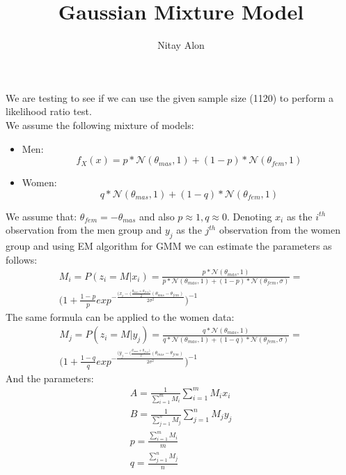 \documentclass[12pt]{article}
\title{Gaussian Mixture Model}
\author{Nitay Alon}
\begin{document}
\maketitle
We are testing to see if we can use the given sample size (1120) to perform a likelihood ratio test. \\
We assume the following mixture of models:
	\begin{itemize}
		\item Men:
		 \begin{equation*}
		 f_X(x) = p * \mathcal{N}(\theta_{mas},1) + (1-p) * \mathcal{N}(\theta_{fem},1)
		 \end{equation*}
		 \item Women:
		 \begin{equation*}
		 q * \mathcal{N}(\theta_{mas},1) + (1-q) * \mathcal{N}(\theta_{fem},1)
		 \end{equation*}
	\end{itemize}
We assume that: $\theta_{fem} = -\theta_{mas}$ and also $p \approx 1, q \approx 0$.
Denoting $x_i$ as the $i^{th}$ observation from the men group and $y_j$ as the $j^{th}$ observation from the women group and 
using EM algorithm for GMM we can estimate the parameters as follows:
\begin{multline}
M_i = P(z_i = M|x_i) = \frac{p * \mathcal{N}(\theta_{mas},1)}{p * \mathcal{N}(\theta_{mas},1) + (1-p) * \mathcal{N}(\theta_{fem},\sigma)
} = \\
\big(1 + \frac{1-p}{p}exp^{-\frac{(x_i - (\frac{\theta_{mas}+\theta_{fem})}{2}(\theta_{mas}-\theta_{fem})}{2\sigma^2}} \big)^{-1}
\end{multline}
The same formula can be applied to the women data:
\begin{multline}
M_j = P(z_i = M|y_j) = \frac{q * \mathcal{N}(\theta_{mas},1)}{q * \mathcal{N}(\theta_{mas},1) + (1-q) * \mathcal{N}(\theta_{fem},\sigma)
} = \\
\big(1 + \frac{1-q}{q}exp^{-\frac{(y_j - (\frac{\theta_{mas}+\theta_{fem})}{2}(\theta_{mas}-\theta_{fem})}{2\sigma^2}} \big)^{-1}
\end{multline}
And the parameters:
\begin{gather} 	
A = \frac{1}{\sum_{i=1}^{m}M_i}\sum_{i=1}^{m}M_i x_i \\
B = \frac{1}{\sum_{j=1}^{n}M_j}\sum_{j=1}^{n}M_j y_j \\
p = \frac{\sum_{i=1}^{m}M_i}{m} \\
q = \frac{\sum_{j=1}^{n}M_j}{n} \\
\end{gather}
\end{document}
